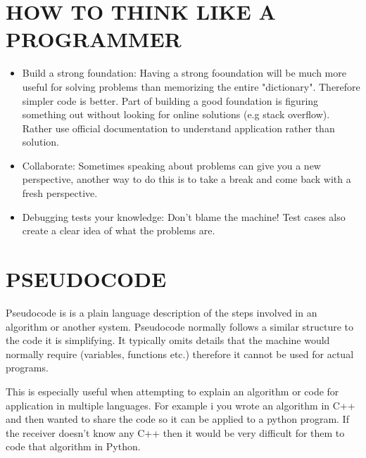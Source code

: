 \documentclass[a4paper]{article}
\begin{document}
\section{HOW TO THINK LIKE A PROGRAMMER}
\begin{itemize}
    \item Build a strong foundation: Having a strong fooundation will be much more useful for solving problems than memorizing the entire "dictionary". Therefore simpler code is better. Part of building a good foundation is figuring something out without looking for online solutions (e.g stack overflow). Rather use official documentation to understand application rather than  solution. 
\item Collaborate: Sometimes speaking about problems can give you a new perspective, another way to do this is to take a break and come back with a fresh perspective. 
\item Debugging tests your knowledge: Don't blame the machine! Test cases also create a clear idea of what the problems are.
\end{itemize}

\newpage

\section{PSEUDOCODE}
Pseudocode is is a plain language description of the steps involved in an algorithm or another system. Pseudocode normally follows a similar structure to the code it is simplifying. It typically omits details that the machine would normally require (variables, functions etc.) therefore it cannot be used for actual programs. 

This is especially useful when attempting to explain an algorithm or code for application in multiple languages. For example i you wrote an algorithm in C++ and then wanted to share the code so it can be applied to a python program. If the receiver doesn't know any C++ then it would be very difficult for them to code that algorithm in Python.
\end{document}
